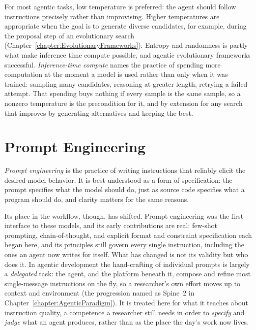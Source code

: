 For most agentic tasks, low temperature is preferred: the agent should follow instructions precisely rather than improvising.
Higher temperatures are appropriate when the goal is to generate diverse candidates, for example, during the proposal step of an evolutionary search (Chapter~\ref{chapter:EvolutionaryFrameworks}).
Entropy and randomness is partly what make inference time compute possible, and agentic evolutionary frameworks successful.
\emph{Inference-time compute} names the practice of spending more computation at the moment a model is used rather than only when it was trained: sampling many candidates, reasoning at greater length, retrying a failed attempt.
That spending buys nothing if every sample is the same sample, so a nonzero temperature is the precondition for it, and by extension for any search that improves by generating alternatives and keeping the best.

\section{Prompt Engineering}
\label{section:PromptEngineering}

\emph{Prompt engineering} is the practice of writing instructions that reliably elicit the desired model behavior.
It is best understood as a form of specification: the prompt specifies what the model should do, just as source code specifies what a program should do, and clarity matters for the same reasons.

Its place in the workflow, though, has shifted.
Prompt engineering was the first interface to these models, and its early contributions are real: few-shot prompting, chain-of-thought, and explicit format and constraint specification each began here, and its principles still govern every single instruction, including the ones an agent now writes for itself.
What has changed is not its validity but who does it.
In agentic development the hand-crafting of individual prompts is largely a \emph{delegated} task: the agent, and the platform beneath it, compose and refine most single-message instructions on the fly, so a researcher's own effort moves up to context and environment (the progression named as Spine~2 in Chapter~\ref{chapter:AgenticParadigm}).
It is treated here for what it teaches about instruction quality, a competence a researcher still needs in order to \emph{specify} and \emph{judge} what an agent produces, rather than as the place the day's work now lives.

